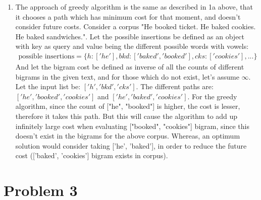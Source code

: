 \documentclass[12pt]{article}
\begin{document}
\begin{enumerate}[label=(\alph*)]
  \item The approach of greedy algorithm is the same as described in 1a above, that it chooses a path which has minimum cost for that moment, and doesn't consider future costs. Consider a corpus "He booked ticket. He baked cookies. He baked sandwiches.". Let the possible insertions be defined as an object with key as query and value being the different possible words with vowels: \\
  \begin{align*}
  \text{possible insertions} = \{ h: ['he'], bkd: ['baked', 'booked'], cks: ['cookies'], ...\} 
  \end{align*}
  And let the bigram cost be defined as inverse of all the counts of different bigrams in the given text, and for those which do not exist, let's assume $\infty$. Let the input list be: $['h', 'bkd', 'cks']$. The different paths are: $['he', 'booked', 'cookies']$ and $['he', 'baked', 'cookies']$.
  For the greedy algorithm, since the count of ["he", "booked"] is higher, the cost is lesser, therefore it takes this path. But this will cause the algorithm to add up infinitely large cost when evaluating  ["booked", "cookies"] bigram, since this doesn't exist in the bigrams for the above corpus. Whereas, an optimum solution would consider taking ['he', 'baked'], in order to reduce the future cost (['baked', 'cookies'] bigram exists in corpus). 

\end{enumerate}

\section*{Problem 3}
\end{document}

